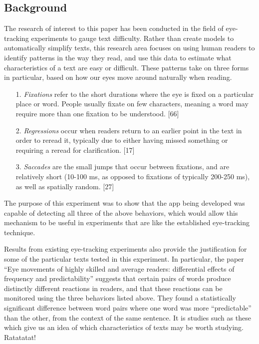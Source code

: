 \documentclass[11pt,letterpaper]{article}
\begin{document}
	\subsection{Background}
	
	The research of interest to this paper has been conducted in the field of eye-tracking experiments to gauge text difficulty. Rather than create models to automatically simplify texts, this research area focuses on using human readers to identify patterns in the way they read, and use this data to estimate what characteristics of a text are easy or difficult. These patterns take on three forms in particular, based on how our eyes move around naturally when reading.
	
	\begin{itemize}[noitemsep]
		\item[1.] \textit{Fixations} refer to the short durations where the eye is fixed on a particular place or word. People usually fixate on few characters, meaning a word may require more than one fixation to be understood. [66]
		\item[2.] \textit{Regressions} occur when readers return to an earlier point in the text in order to reread it, typically due to either having missed something or requiring a reread for clarification. [17]
		\item[3.] \textit{Saccades} are the small jumps that occur between fixations, and are relatively short (10-100 ms, as opposed to fixations of typically 200-250 ms), as well as spatially random. [27]
	\end{itemize}
	
	The purpose of this experiment was to show that the app being developed was capable of detecting all three of the above behaviors, which would allow this mechanism to be useful in experiments that are like the established eye-tracking technique.
	
	Results from existing eye-tracking experiments also provide the justification for some of the particular texts tested in this experiment. In particular, the paper ``Eye movements of highly skilled and average readers: differential effects of frequency and predictability'' suggests that certain pairs of words produce distinctly different reactions in readers, and that these reactions can be monitored using the three behaviors listed above. They found a statistically significant difference between word pairs where one word was more ``predictable'' than the other, from the context of the same sentence. It is studies such as these which give us an idea of which characteristics of texts may be worth studying. Ratatatat!
	
\end{document}

